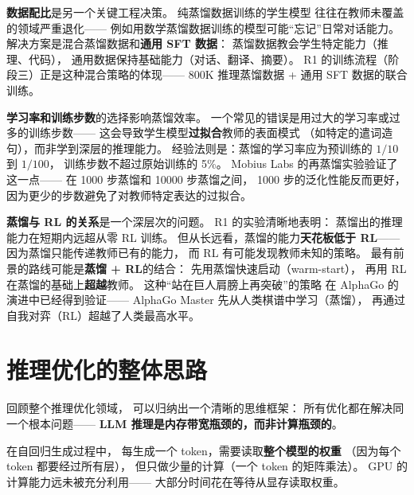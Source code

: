\textbf{数据配比}是另一个关键工程决策。
纯蒸馏数据训练的学生模型
往往在教师未覆盖的领域严重退化——
例如用数学蒸馏数据训练的模型可能``忘记''日常对话能力。
解决方案是混合蒸馏数据和\textbf{通用 SFT 数据}：
蒸馏数据教会学生特定能力（推理、代码），
通用数据保持基础能力（对话、翻译、摘要）。
R1 的训练流程（阶段三）正是这种混合策略的体现——
800K 推理蒸馏数据 + 通用 SFT 数据的联合训练。

\textbf{学习率和训练步数}的选择影响蒸馏效率。
一个常见的错误是用过大的学习率或过多的训练步数——
这会导致学生模型\textbf{过拟合}教师的表面模式
（如特定的遣词造句），而非学到深层的推理能力。
经验法则是：蒸馏的学习率应为预训练的 $1/10$ 到 $1/100$，
训练步数不超过原始训练的 5\%。
Mobius Labs 的再蒸馏实验验证了这一点——
在 1000 步蒸馏和 10000 步蒸馏之间，
1000 步的泛化性能反而更好，
因为更少的步数避免了对教师特定表达的过拟合。

\textbf{蒸馏与 RL 的关系}是一个深层次的问题。
R1 的实验清晰地表明：
蒸馏出的推理能力在短期内远超从零 RL 训练。
但从长远看，蒸馏的能力\textbf{天花板低于 RL}——
因为蒸馏只能传递教师已有的能力，
而 RL 有可能发现教师未知的策略。
最有前景的路线可能是\textbf{蒸馏 + RL}的结合：
先用蒸馏快速启动（warm-start），
再用 RL 在蒸馏的基础上\textbf{超越}教师。
这种``站在巨人肩膀上再突破''的策略
在 AlphaGo 的演进中已经得到验证——
AlphaGo Master 先从人类棋谱中学习（蒸馏），
再通过自我对弈（RL）超越了人类最高水平。


\section{推理优化的整体思路}

回顾整个推理优化领域，
可以归纳出一个清晰的思维框架：
所有优化都在解决同一个根本问题——
\textbf{LLM 推理是内存带宽瓶颈的，而非计算瓶颈的}。

在自回归生成过程中，
每生成一个 token，需要读取\textbf{整个模型的权重}
（因为每个 token 都要经过所有层），
但只做少量的计算（一个 token 的矩阵乘法）。
GPU 的计算能力远未被充分利用——
大部分时间花在等待从显存读取权重。

